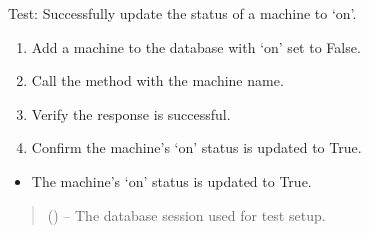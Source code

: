 \documentclass[letterpaper,10pt,english]{sphinxmanual}
\begin{document}
\begin{fulllineitems}
\label{\detokenize{test:test.test_machine.test_update_machine_status_success}}
\pysigstartsignatures
\pysiglinewithargsret
{}
{}
{}
\pysigstopsignatures
\sphinxAtStartPar
Test: Successfully update the status of a machine to ‘on’.
\begin{description}
\begin{enumerate}
%
\item {} 
\sphinxAtStartPar
Add a machine to the database with ‘on’ set to False.

\item {} 
\sphinxAtStartPar
Call the  method with the machine name.

\item {} 
\sphinxAtStartPar
Verify the response is successful.

\item {} 
\sphinxAtStartPar
Confirm the machine’s ‘on’ status is updated to True.

\end{enumerate}

\begin{itemize}
\item {} 
\sphinxAtStartPar
The machine’s ‘on’ status is updated to True.

\end{itemize}

\end{description}
\begin{quote}\begin{description}
\sphinxAtStartPar
{} () – The database session used for test setup.

\end{description}\end{quote}

\end{fulllineitems}

\end{document}
